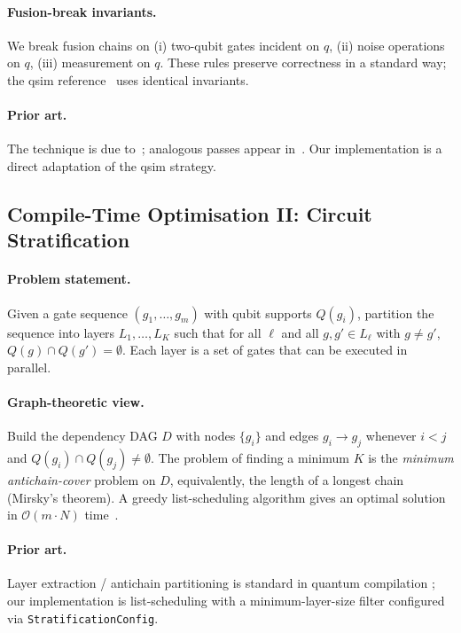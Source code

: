 \documentclass[11pt,a4paper]{article}
\begin{document}
\paragraph{Fusion-break invariants.}
We break fusion chains on (i) two-qubit gates incident on $q$, (ii) noise operations on
$q$, (iii) measurement on $q$. These rules preserve correctness in a standard way; the
qsim reference~\cite{qsim} uses identical invariants.

\paragraph{Prior art.}
The technique is due to~\cite{qsim}; analogous passes appear in~\cite{hanersteiger2017,
khammassi2017qx,sivarajah2020tket,zulehner2018qmdd}. Our implementation is a direct
adaptation of the qsim strategy.

\subsection{Compile-Time Optimisation II: Circuit Stratification}
\label{sec:stratification}

\paragraph{Problem statement.}
Given a gate sequence $(g_1,\ldots,g_m)$ with qubit supports $Q(g_i)$, partition the
sequence into layers $L_1,\ldots,L_K$ such that for all $\ell$ and all $g, g' \in L_\ell$
with $g \neq g'$, $Q(g) \cap Q(g') = \emptyset$. Each layer is a set of gates that can
be executed in parallel.

\paragraph{Graph-theoretic view.}
Build the dependency DAG $D$ with nodes $\{g_i\}$ and edges $g_i \to g_j$ whenever
$i < j$ and $Q(g_i) \cap Q(g_j) \neq \emptyset$. The problem of finding a minimum
$K$ is the \emph{minimum antichain-cover} problem on $D$, equivalently, the length of
a longest chain (Mirsky's theorem). A greedy list-scheduling algorithm gives an
optimal solution in $\mathcal{O}(m\cdot N)$ time~\cite{cormen2009}.

\paragraph{Prior art.}
Layer extraction / antichain partitioning is standard in quantum compilation
\cite{sivarajah2020tket,cowtan2019}; our implementation is list-scheduling with a
minimum-layer-size filter configured via \texttt{StratificationConfig}.
\end{document}
